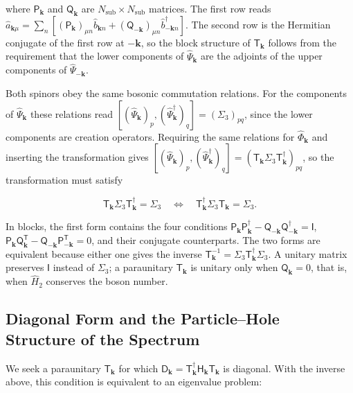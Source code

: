 where \(\mathsf P_{\mathbf k}\) and \(\mathsf Q_{\mathbf k}\) are \(N_{\mathrm{sub}}\times N_{\mathrm{sub}}\) matrices. The first row reads \(\hat a_{\mathbf k\mu}=\sum_n[(\mathsf P_{\mathbf k})_{\mu n}\hat b_{\mathbf kn}+(\mathsf Q_{-\mathbf k})_{\mu n}\hat b_{-\mathbf kn}^\dagger]\). The second row is the Hermitian conjugate of the first row at \(-\mathbf k\), so the block structure of \(\mathsf T_{\mathbf k}\) follows from the requirement that the lower components of \(\hat\Psi_{\mathbf k}\) are the adjoints of the upper components of \(\hat\Psi_{-\mathbf k}\).

Both spinors obey the same bosonic commutation relations. For the components of \(\hat\Psi_{\mathbf k}\) these relations read \([(\hat\Psi_{\mathbf k})_p,(\hat\Psi_{\mathbf k}^\dagger)_q]=(\Sigma_3)_{pq}\), since the lower components are creation operators. Requiring the same relations for \(\hat\Phi_{\mathbf k}\) and inserting the transformation gives \([(\hat\Psi_{\mathbf k})_p,(\hat\Psi_{\mathbf k}^\dagger)_q]=(\mathsf T_{\mathbf k}\Sigma_3\mathsf T_{\mathbf k}^\dagger)_{pq}\), so the transformation must satisfy

\begin{equation}\label{eq-lswt-paraunitary-condition}
\mathsf T_{\mathbf k}\Sigma_3\mathsf T_{\mathbf k}^\dagger=\Sigma_3
\quad\Longleftrightarrow\quad
\mathsf T_{\mathbf k}^\dagger\Sigma_3\mathsf T_{\mathbf k}=\Sigma_3.
\end{equation}

In blocks, the first form contains the four conditions \(\mathsf P_{\mathbf k}\mathsf P_{\mathbf k}^\dagger-\mathsf Q_{-\mathbf k}\mathsf Q_{-\mathbf k}^\dagger=\mathsf I\), \(\mathsf P_{\mathbf k}\mathsf Q_{\mathbf k}^{\mathsf T}-\mathsf Q_{-\mathbf k}\mathsf P_{-\mathbf k}^{\mathsf T}=0\), and their conjugate counterparts. The two forms are equivalent because either one gives the inverse \(\mathsf T_{\mathbf k}^{-1}=\Sigma_3\mathsf T_{\mathbf k}^\dagger\Sigma_3\). A unitary matrix preserves \(\mathsf I\) instead of \(\Sigma_3\); a paraunitary \(\mathsf T_{\mathbf k}\) is unitary only when \(\mathsf Q_{\mathbf k}=0\), that is, when \(\hat H_2\) conserves the boson number.

\subsection{Diagonal Form and the Particle--Hole Structure of the Spectrum}

We seek a paraunitary \(\mathsf T_{\mathbf k}\) for which \(\mathsf D_{\mathbf k}=\mathsf T_{\mathbf k}^\dagger\mathsf H_{\mathbf k}\mathsf T_{\mathbf k}\) is diagonal. With the inverse above, this condition is equivalent to an eigenvalue problem:


